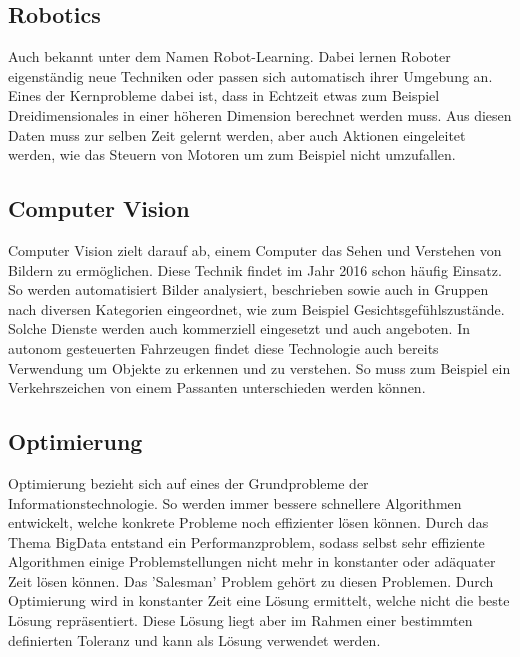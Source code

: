 \subsection{Robotics}
\label{subsec:Robotics}

Auch bekannt unter dem Namen Robot-Learning. 
Dabei lernen Roboter eigenständig neue Techniken oder passen sich automatisch ihrer Umgebung an. 
Eines der Kernprobleme dabei ist, dass in Echtzeit etwas zum Beispiel Dreidimensionales in einer höheren Dimension berechnet werden muss.
Aus diesen Daten muss zur selben Zeit gelernt werden, aber auch Aktionen eingeleitet werden, wie das Steuern von Motoren um zum Beispiel nicht umzufallen.

\subsection{Computer Vision}
\label{subsec:Cumputer Vision}

Computer Vision zielt darauf ab, einem Computer das Sehen und Verstehen von Bildern zu ermöglichen. 
Diese Technik findet im Jahr 2016 schon häufig Einsatz. 
So werden automatisiert Bilder analysiert, beschrieben sowie auch in Gruppen nach diversen Kategorien eingeordnet, wie zum Beispiel Gesichtsgefühlszustände.
Solche Dienste werden auch kommerziell eingesetzt und auch angeboten. 
In autonom gesteuerten Fahrzeugen findet diese Technologie auch bereits Verwendung um Objekte zu erkennen und zu verstehen. 
So muss zum Beispiel ein Verkehrszeichen von einem Passanten unterschieden werden können.

\subsection{Optimierung}
\label{subsec:Optimization}

Optimierung bezieht sich auf eines der Grundprobleme der Informationstechnologie. 
So werden immer bessere schnellere Algorithmen entwickelt, welche konkrete Probleme noch effizienter lösen können. 
Durch das Thema BigData entstand ein Performanzproblem, sodass selbst sehr effiziente Algorithmen einige Problemstellungen nicht mehr in konstanter oder adäquater Zeit lösen können. 
Das 'Salesman' Problem gehört zu diesen Problemen. 
Durch Optimierung wird in konstanter Zeit eine Lösung ermittelt, welche nicht die beste Lösung repräsentiert. 
Diese Lösung liegt aber im Rahmen einer bestimmten definierten Toleranz und kann als Lösung verwendet werden. \cite{AI3}


